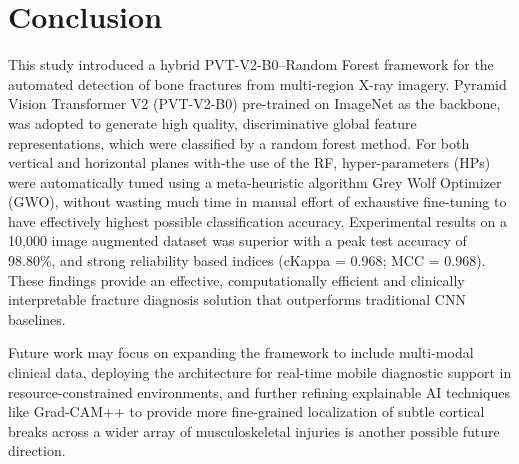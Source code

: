 \documentclass{styles/svproc}
\begin{document}
\section{Conclusion} \label{conclusion}

This study introduced a hybrid PVT-V2-B0–Random Forest framework for the automated detection of bone fractures from multi-region X-ray imagery. Pyramid Vision Transformer V2 (PVT-V2-B0) pre-trained on ImageNet as the backbone, was adopted to generate high quality, discriminative global feature representations, which were classified by a random forest method. For both vertical and horizontal planes with-the use of the RF, hyper-parameters (HPs) were automatically tuned using a meta-heuristic algorithm Grey Wolf Optimizer (GWO), without wasting much time in manual effort of exhaustive fine-tuning to have effectively highest possible classification accuracy. Experimental results on a 10,000 image augmented dataset was superior with a peak test accuracy of 98.80\%, and strong reliability based indices (cKappa = 0.968; MCC = 0.968). These findings provide an effective, computationally efficient and clinically interpretable fracture diagnosis solution that outperforms traditional CNN baselines.

Future work may focus on expanding the framework to include multi-modal clinical data, deploying the architecture for real-time mobile diagnostic support in resource-constrained environments, and further refining explainable AI techniques like Grad-CAM++ to provide more fine-grained localization of subtle cortical breaks across a wider array of musculoskeletal injuries is another possible future direction.
\end{document}
